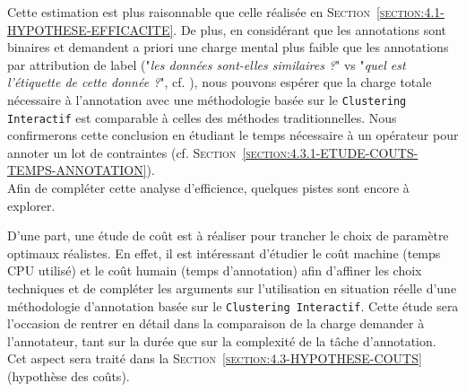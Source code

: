 			Cette estimation est plus raisonnable que celle réalisée en \textsc{Section~\ref{section:4.1-HYPOTHESE-EFFICACITE}}.
			De plus, en considérant que les annotations sont binaires et demandent a priori une charge mental plus faible que les annotations par attribution de label ("\textit{les données sont-elles similaires ?}" vs "\textit{quel est l'étiquette de cette donnée ?}", cf. \cite{hart-staveland:1988:development-nasatlx-task}), nous pouvons espérer que la charge totale nécessaire à l'annotation avec une méthodologie basée sur le \texttt{Clustering Interactif} est comparable à celles des méthodes traditionnelles.
			Nous confirmerons cette conclusion en étudiant le temps nécessaire à un opérateur pour annoter un lot de contraintes (cf. \textsc{Section~\ref{section:4.3.1-ETUDE-COUTS-TEMPS-ANNOTATION}}).
			\\
			
			Afin de compléter cette analyse d'efficience, quelques pistes sont encore à explorer.
			
			D'une part, une étude de coût est à réaliser pour trancher le choix de paramètre optimaux réalistes.
			En effet, il est intéressant d'étudier le coût machine (temps CPU utilisé) et le coût humain (temps d'annotation) afin d'affiner les choix techniques et de compléter les arguments sur l'utilisation en situation réelle d'une méthodologie d'annotation basée sur le \texttt{Clustering Interactif}.
			Cette étude sera l'occasion de rentrer en détail dans la comparaison de la charge demander à l'annotateur, tant sur la durée que sur la complexité de la tâche d'annotation.
			Cet aspect sera traité dans la \textsc{Section~\ref{section:4.3-HYPOTHESE-COUTS}} (hypothèse des coûts).
			
